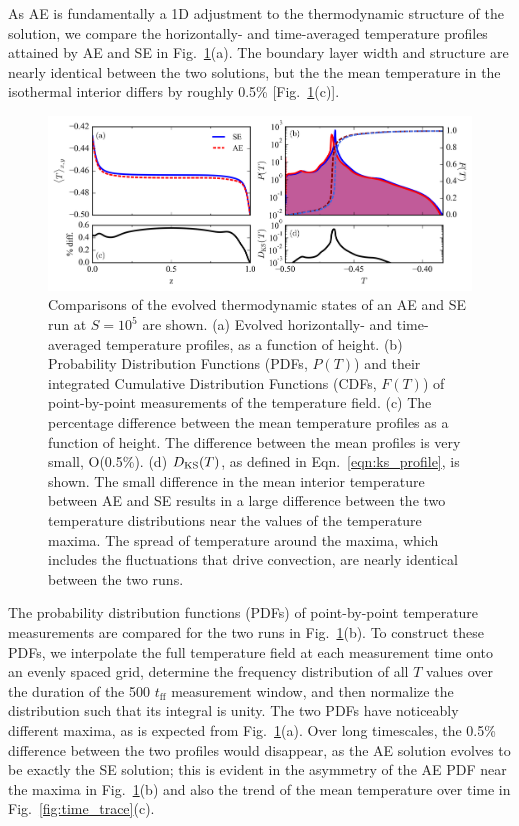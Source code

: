 As AE is fundamentally a 1D adjustment to the thermodynamic structure of the
solution, we compare the horizontally- and time-averaged temperature profiles 
attained by AE and SE in Fig.~\ref{fig:temp_comparison}(a).  
The boundary layer width and structure are  
nearly identical between the two solutions, but the
the mean temperature in the isothermal interior differs by roughly 0.5\%
[Fig.~\ref{fig:temp_comparison}(c)]. 

\begin{figure}[ht!]
\includegraphics[width=\textwidth]{./figs/temp_comparison.png}
\caption{Comparisons of the evolved thermodynamic states of an AE and SE run
at $S = 10^{5}$ are shown.  (a) Evolved horizontally- and time-averaged 
temperature profiles, as a function of height.
(b) Probability Distribution Functions (PDFs, $P(T)$) and their integrated
Cumulative Distribution Functions (CDFs, $F(T)$)
of point-by-point measurements of the temperature field.
(c) The percentage difference between the mean temperature profiles as a function of height.
The difference between the mean profiles is very small, O(0.5\%).
(d) $D_{\text{KS}}(T)$, as defined in Eqn.~\ref{eqn:ks_profile}, is shown. The small
difference in the mean interior temperature between AE and SE
results in a large difference between the two temperature distributions near the values
of the temperature maxima.  The spread of temperature around the maxima, which includes the 
fluctuations that drive convection, are nearly identical between the two runs.
\label{fig:temp_comparison} }
\end{figure}





The probability distribution functions (PDFs)
of point-by-point temperature measurements are compared for the two runs
in Fig.~\ref{fig:temp_comparison}(b). To construct these PDFs, 
we interpolate the full temperature field
at each measurement time onto an evenly spaced grid, determine the
frequency distribution of all $T$ values over the duration of the 500 $t_{\text{ff}}$
measurement window, and then normalize the
distribution such that its integral is unity.  The two PDFs have noticeably
different maxima, as is expected from Fig.~\ref{fig:temp_comparison}(a). 
Over long timescales, the 0.5\% difference between the two profiles would
disappear, as the AE solution evolves to be exactly the SE solution; this
is evident in the asymmetry of the AE PDF near the maxima
in Fig.~\ref{fig:temp_comparison}(b) and also
the trend of the mean temperature over time in Fig.~\ref{fig:time_trace}(c).

